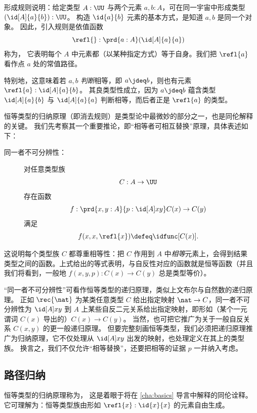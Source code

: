 形成规则说明：给定类型 $A:\UU$ 与两个元素 $a,b:A$，可在同一宇宙中形成类型 $(\id[A]{a}{b}):\UU$。
构造 $\id{a}{b}$ 元素的基本方式，是知道 $a,b$ 是同一个对象。
因此，引入规则是依值函数
\[\refl{} : \prd{a:A} (\id[A]{a}{a})\]
称为，
%
它表明每个 $A$ 中元素都（以某种指定方式）等于自身。我们把 $\refl{a}$ 看作点 $a$ 处的常值路径。

特别地，这意味着若 $a,b$ \emph{判断}相等，即 $a\jdeq b$，则也有元素 $\refl{a} : \id[A]{a}{b}$。
其良类型性成立，因为 $a\jdeq b$ 蕴含类型 $\id[A]{a}{b}$ 与 $\id[A]{a}{a}$ 判断相等，而后者正是 $\refl{a}$ 的类型。

恒等类型的归纳原理（即消去规则）是类型论中最微妙的部分之一，也是同伦解释的关键。
我们先考察其一个重要推论，即“相等者可相互替换”原理，具体表述如下：
%
%
\begin{description}
\item[同一者不可分辨性：]
对任意类型族
\[
C : A \to \UU
\]
存在函数
\[
f : \prd{x,y:A}{p:\id[A] x y} C(x) \to C(y)
\]
满足
\[
f(x,x,\refl{x}) \defeq \idfunc[C(x)].
\]
\end{description}
这说明每个类型族 $C$ 都尊重相等性：把 $C$ 作用到 $A$ 中\emph{相等}元素上，会得到结果类型之间的函数。上式给出的等式表明，与自反性对应的函数就是恒等函数（并且我们将看到，一般地 $f(x,y,p): C(x) \to C(y)$ 总是类型等价）。

“同一者不可分辨性”可看作恒等类型的递归原理，类似上文布尔与自然数的递归原理。
正如 $\rec{\nat}$ 为某类任意类型 $C$ 给出指定映射 $\nat\to C$，同一者不可分辨性为 $\id[A] x y$ 到 $A$ 上某些自反二元关系给出指定映射，即形如（某个一元谓词 $C(x)$ 导出的）$C(x)\to C(y)$。
当然，也可把它推广为关于一般自反关系 $C(x,y)$ 的更一般递归原理。
但要完整刻画恒等类型，我们必须把递归原理推广为归纳原理，它不仅处理从 $\id[A] x y$ 出发的映射，也处理定义在其上的类型族。
换言之，我们不仅允许“相等替换”，还要把相等的证据 $p$ 一并纳入考虑。
    
\subsection{路径归纳}

恒等类型的归纳原理称为，
%
%
这是着眼于将在 \cref{cha:basics} 导言中解释的同伦诠释。它可理解为：恒等类型族由形如 $\refl{x}: \id{x}{x}$ 的元素自由生成。

